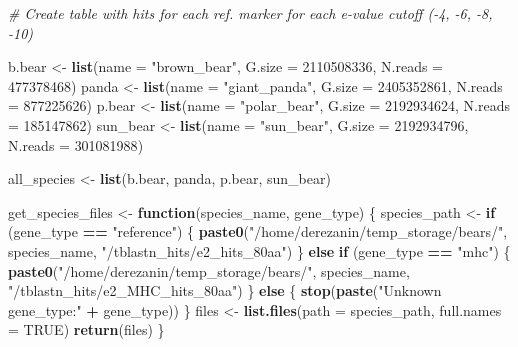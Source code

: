 \documentclass[]{article}
\newenvironment{Shaded}{\begin{snugshade}}{\end{snugshade}}
\newcommand{\KeywordTok}[1]{\textcolor[rgb]{0.13,0.29,0.53}{\textbf{#1}}}
\newcommand{\DataTypeTok}[1]{\textcolor[rgb]{0.13,0.29,0.53}{#1}}
\newcommand{\DecValTok}[1]{\textcolor[rgb]{0.00,0.00,0.81}{#1}}
\newcommand{\StringTok}[1]{\textcolor[rgb]{0.31,0.60,0.02}{#1}}
\newcommand{\CommentTok}[1]{\textcolor[rgb]{0.56,0.35,0.01}{\textit{#1}}}
\newcommand{\OtherTok}[1]{\textcolor[rgb]{0.56,0.35,0.01}{#1}}
\newcommand{\ControlFlowTok}[1]{\textcolor[rgb]{0.13,0.29,0.53}{\textbf{#1}}}
\newcommand{\OperatorTok}[1]{\textcolor[rgb]{0.81,0.36,0.00}{\textbf{#1}}}
\newcommand{\NormalTok}[1]{#1}
\begin{document}
\begin{Shaded}
\begin{Highlighting}[]
\CommentTok{# Create table with hits for each ref. marker for each e-value cutoff (-4, -6, -8, -10)}

\NormalTok{b.bear <-}\StringTok{ }\KeywordTok{list}\NormalTok{(}\DataTypeTok{name =} \StringTok{"brown_bear"}\NormalTok{, }\DataTypeTok{G.size =} \DecValTok{2110508336}\NormalTok{, }\DataTypeTok{N.reads =} \DecValTok{477378468}\NormalTok{)}
\NormalTok{panda <-}\StringTok{ }\KeywordTok{list}\NormalTok{(}\DataTypeTok{name =} \StringTok{"giant_panda"}\NormalTok{, }\DataTypeTok{G.size =} \DecValTok{2405352861}\NormalTok{, }\DataTypeTok{N.reads =} \DecValTok{877225626}\NormalTok{)}
\NormalTok{p.bear <-}\StringTok{ }\KeywordTok{list}\NormalTok{(}\DataTypeTok{name =} \StringTok{"polar_bear"}\NormalTok{, }\DataTypeTok{G.size =} \DecValTok{2192934624}\NormalTok{, }\DataTypeTok{N.reads =} \DecValTok{185147862}\NormalTok{)}
\NormalTok{sun_bear <-}\StringTok{ }\KeywordTok{list}\NormalTok{(}\DataTypeTok{name =} \StringTok{"sun_bear"}\NormalTok{, }\DataTypeTok{G.size =} \DecValTok{2192934796}\NormalTok{, }\DataTypeTok{N.reads =} \DecValTok{301081988}\NormalTok{)}

\NormalTok{all_species <-}\StringTok{ }\KeywordTok{list}\NormalTok{(b.bear, panda, p.bear, sun_bear)}


\NormalTok{get_species_files <-}\StringTok{ }\ControlFlowTok{function}\NormalTok{(species_name, gene_type) \{}
\NormalTok{  species_path <-}
\StringTok{    }\ControlFlowTok{if}\NormalTok{ (gene_type }\OperatorTok{==}\StringTok{ "reference"}\NormalTok{) \{}
      \KeywordTok{paste0}\NormalTok{(}\StringTok{"/home/derezanin/temp_storage/bears/"}\NormalTok{, species_name, }\StringTok{"/tblastn_hits/e2_hits_80aa"}\NormalTok{)}
\NormalTok{    \} }\ControlFlowTok{else} \ControlFlowTok{if}\NormalTok{ (gene_type }\OperatorTok{==}\StringTok{ "mhc"}\NormalTok{) \{}
      \KeywordTok{paste0}\NormalTok{(}\StringTok{"/home/derezanin/temp_storage/bears/"}\NormalTok{, species_name, }\StringTok{"/tblastn_hits/e2_MHC_hits_80aa"}\NormalTok{)}
\NormalTok{    \} }\ControlFlowTok{else}\NormalTok{ \{}
      \KeywordTok{stop}\NormalTok{(}\KeywordTok{paste}\NormalTok{(}\StringTok{"Unknown gene_type:"} \OperatorTok{+}\StringTok{ }\NormalTok{gene_type))}
\NormalTok{    \}}
\NormalTok{  files <-}\StringTok{ }\KeywordTok{list.files}\NormalTok{(}\DataTypeTok{path =}\NormalTok{ species_path, }\DataTypeTok{full.names =} \OtherTok{TRUE}\NormalTok{)}
  \KeywordTok{return}\NormalTok{(files)}
\NormalTok{\}}


\end{Highlighting}
\end{Shaded}
\end{document}
